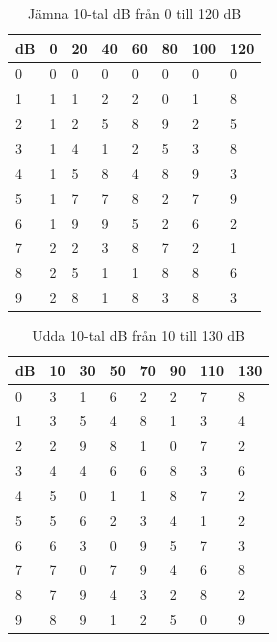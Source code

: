 \begin{rev-raderas}

\begin{table}[h]
  \caption{Jämna 10-tal dB från 0 till 120 dB}
  \label{tab:db-jämna-0-120}
  \begin{tabular}{l|lllllll}
    dB & 0 & 20 & 40 & 60 & 80 & 100 & 120 \\
    \hline
    0 & 0 & 0 & 0 & 0 & 0 & 0 & 0 \\
    1 & 1 & 1 & 2 & 2 & 0 & 1 & 8 \\
    2 & 1 & 2 & 5 & 8 & 9 & 2 & 5 \\
    3 & 1 & 4 & 1 & 2 & 5 & 3 & 8 \\
    4 & 1 & 5 & 8 & 4 & 8 & 9 & 3 \\
    5 & 1 & 7 & 7 & 8 & 2 & 7 & 9 \\
    6 & 1 & 9 & 9 & 5 & 2 & 6 & 2 \\
    7 & 2 & 2 & 3 & 8 & 7 & 2 & 1 \\
    8 & 2 & 5 & 1 & 1 & 8 & 8 & 6 \\
    9 & 2 & 8 & 1 & 8 & 3 & 8 & 3 \\
  \end{tabular}
\end{table}



\begin{table}[h]
  \caption{Udda 10-tal dB från 10 till 130 dB}
  \label{tab:db-udda-10-130}
  \begin{tabular}{l|lllllll}
    dB & 10 & 30 & 50 & 70 & 90 & 110 & 130 \\
    \hline
    0 & 3 & 1 & 6 & 2 & 2 & 7 & 8 \\
    1 & 3 & 5 & 4 & 8 & 1 & 3 & 4 \\
    2 & 2 & 9 & 8 & 1 & 0 & 7 & 2 \\
    3 & 4 & 4 & 6 & 6 & 8 & 3 & 6 \\
    4 & 5 & 0 & 1 & 1 & 8 & 7 & 2 \\
    5 & 5 & 6 & 2 & 3 & 4 & 1 & 2 \\
    6 & 6 & 3 & 0 & 9 & 5 & 7 & 3 \\
    7 & 7 & 0 & 7 & 9 & 4 & 6 & 8 \\
    8 & 7 & 9 & 4 & 3 & 2 & 8 & 2 \\
    9 & 8 & 9 & 1 & 2 & 5 & 0 & 9 \\
  \end{tabular}
\end{table}

\end{rev-raderas}
